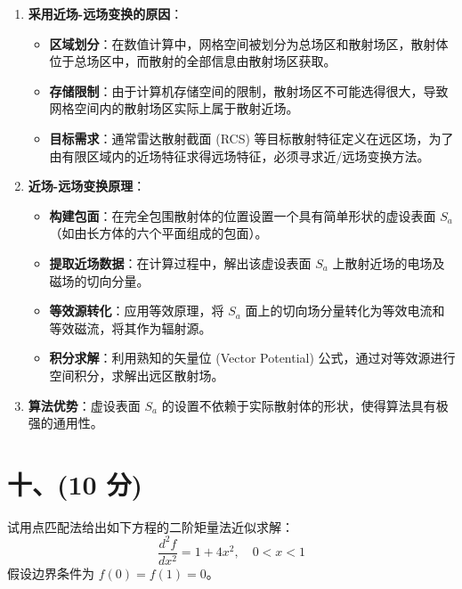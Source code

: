 \documentclass[11pt, a4paper]{article}
\begin{document}
\begin{tcolorbox}[colback=white, colframe=black, title=【解答】（第五章-3）]
\begin{enumerate}
    \item \textbf{采用近场-远场变换的原因}：
    \begin{itemize}
        \item \textbf{区域划分}：在数值计算中，网格空间被划分为总场区和散射场区，散射体位于总场区中，而散射的全部信息由散射场区获取。
        \item \textbf{存储限制}：由于计算机存储空间的限制，散射场区不可能选得很大，导致网格空间内的散射场区实际上属于散射近场。
        \item \textbf{目标需求}：通常雷达散射截面 (RCS) 等目标散射特征定义在远区场，为了由有限区域内的近场特征求得远场特征，必须寻求近/远场变换方法。
    \end{itemize}

    \item \textbf{近场-远场变换原理}：
    \begin{itemize}
        \item \textbf{构建包面}：在完全包围散射体的位置设置一个具有简单形状的虚设表面 $S_a$（如由长方体的六个平面组成的包面）。
        \item \textbf{提取近场数据}：在计算过程中，解出该虚设表面 $S_a$ 上散射近场的电场及磁场的切向分量。
        \item \textbf{等效源转化}：应用等效原理，将 $S_a$ 面上的切向场分量转化为等效电流和等效磁流，将其作为辐射源。
        \item \textbf{积分求解}：利用熟知的矢量位 (Vector Potential) 公式，通过对等效源进行空间积分，求解出远区散射场。
    \end{itemize}
    \item \textbf{算法优势}：虚设表面 $S_a$ 的设置不依赖于实际散射体的形状，使得算法具有极强的通用性。
\end{enumerate}
\end{tcolorbox}

\section*{十、(10 分)}
试用点匹配法给出如下方程的二阶矩量法近似求解：
\begin{equation*}
    \frac{d^2 f}{dx^2} = 1 + 4x^2, \quad 0 < x < 1
\end{equation*}
假设边界条件为 $f(0) = f(1) = 0$。
\end{document}
